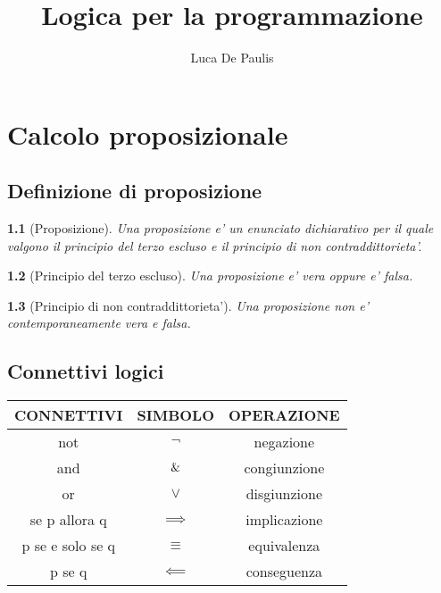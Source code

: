 \documentclass{report}
\author{Luca De Paulis}
\title{Logica per la programmazione}
\newcommand{\OR}{\vee}
\begin{document}
    \maketitle
    
    \newtheorem*{defin}{}
    \newtheorem{obs}{Osservazione}
    \chapter{Calcolo proposizionale}    
    

    \section{Definizione di proposizione}
    \begin{defin}[Proposizione]
        Una proposizione e' un enunciato dichiarativo per il quale valgono
    il principio del terzo escluso e il principio di non contraddittorieta'.
    \end{defin}

    \begin{defin}
        [Principio del terzo escluso]
        Una proposizione e' vera oppure e' falsa.
    \end{defin}

    \begin{defin}
        [Principio di non contraddittorieta']
        Una proposizione non e' contemporaneamente vera e falsa.
    \end{defin}

    \section{Connettivi logici}
    \begin{table}[]
        \centering
        \begin{tabular}{|c|c|c|}
        \hline
        CONNETTIVI       & SIMBOLO                         & OPERAZIONE   \\ \hline
        not              & $\neg$                            & negazione    \\ \hline
        and              & $\And$                          & congiunzione \\ \hline
        or               & $\OR$                            & disgiunzione \\ \hline
        se p allora q    & $\implies$                        & implicazione \\ \hline
        p se e solo se q & $\equiv$                          & equivalenza  \\ \hline
        p se q           & $\impliedby$ & conseguenza  \\ \hline
        \end{tabular}
    \end{table}
\end{document}
